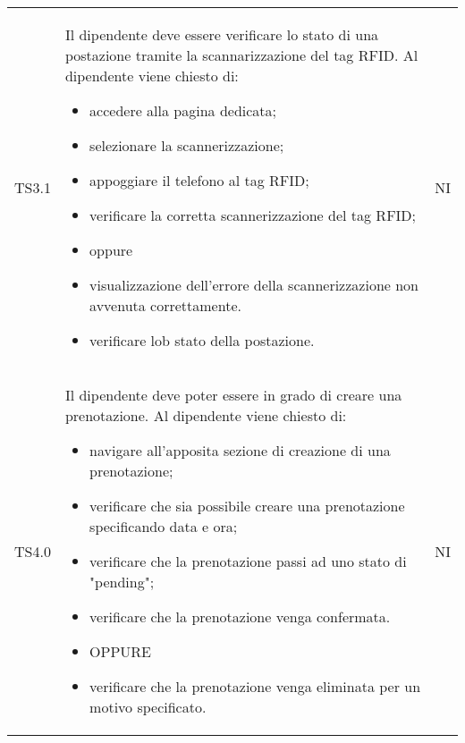 {\begin{longtable}{ c C{11cm} c }
        TS3.1&
        Il dipendente deve essere verificare lo stato di una postazione tramite la scannarizzazione del tag RFID.\newline
        Al dipendente viene chiesto di:
        \begin{itemize}
            \item accedere alla pagina dedicata;
            \item selezionare la scannerizzazione;
            \item appoggiare il telefono al tag RFID;
            \item verificare la corretta scannerizzazione del tag RFID;
            \item [] oppure
            \item visualizzazione dell'errore della scannerizzazione non avvenuta correttamente.
            \item verificare lob stato della postazione.
        \end{itemize}&
        NI\\


        TS4.0&
        Il dipendente deve poter essere in grado di creare una prenotazione.\newline
        Al dipendente viene chiesto di:
        \begin{itemize}
            \item navigare all'apposita sezione di creazione di una prenotazione;
            \item verificare che sia possibile creare una prenotazione specificando data e ora;
            \item verificare che la prenotazione passi ad uno stato di "pending";
            \item verificare che la prenotazione venga confermata.
            \item [] OPPURE
            \item verificare che la prenotazione venga eliminata per un motivo specificato.
        \end{itemize}&
        NI\\


\end{longtable}}
